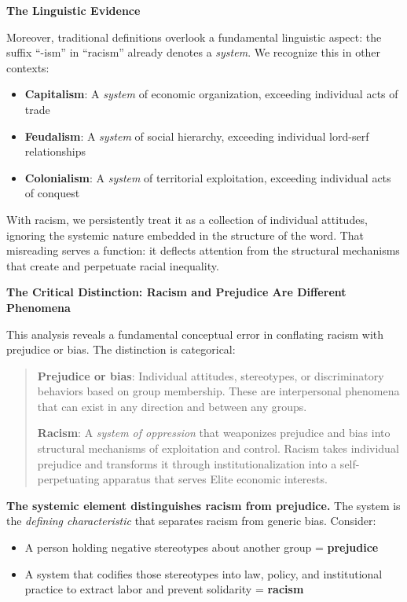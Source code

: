 \textbf{The Linguistic Evidence}

Moreover, traditional definitions overlook a fundamental linguistic aspect: the suffix ``-ism'' in ``racism'' already denotes a \textit{system}. We recognize this in other contexts:
\begin{itemize}
    \item \textbf{Capitalism}: A \textit{system} of economic organization, exceeding individual acts of trade
    \item \textbf{Feudalism}: A \textit{system} of social hierarchy, exceeding individual lord-serf relationships
    \item \textbf{Colonialism}: A \textit{system} of territorial exploitation, exceeding individual acts of conquest
\end{itemize}

With racism, we persistently treat it as a collection of individual attitudes, ignoring the systemic nature embedded in the structure of the word. That misreading serves a function: it deflects attention from the structural mechanisms that create and perpetuate racial inequality.

\textbf{The Critical Distinction: Racism and Prejudice Are Different Phenomena}

This analysis reveals a fundamental conceptual error in conflating racism with prejudice or bias. The distinction is categorical:

\begin{quote}
\textbf{Prejudice or bias}: Individual attitudes, stereotypes, or discriminatory behaviors based on group membership. These are interpersonal phenomena that can exist in any direction and between any groups.

\textbf{Racism}: A \textit{system of oppression} that weaponizes prejudice and bias into structural mechanisms of exploitation and control. Racism takes individual prejudice and transforms it through institutionalization into a self-perpetuating apparatus that serves Elite economic interests.
\end{quote}

\textbf{The systemic element distinguishes racism from prejudice.} The system is the \textit{defining characteristic} that separates racism from generic bias. Consider:

\begin{itemize}
    \item A person holding negative stereotypes about another group = \textbf{prejudice}
    \item A system that codifies those stereotypes into law, policy, and institutional practice to extract labor and prevent solidarity = \textbf{racism}
\end{itemize}

